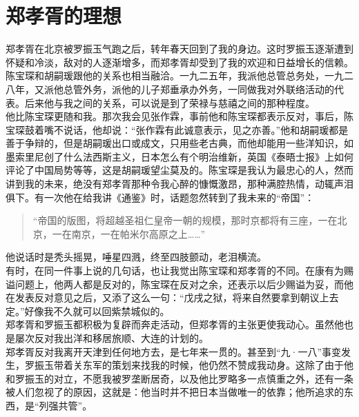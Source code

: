 \fancyhead[RO]{} %
\fancyhead[LE]{} %
\chapter*{郑孝胥的理想}
\thispagestyle{empty}
郑孝胥在北京被罗振玉气跑之后，转年春天回到了我的身边。这时罗振玉逐渐遭到怀疑和冷淡，敌对的人逐渐增多，而郑孝胥却受到了我的欢迎和日益增长的信赖。陈宝琛和胡嗣瑗跟他的关系也相当融洽。一九二五年，我派他总管总务处，一九二八年，又派他总管外务，派他的儿子郑垂承办外务，一同做我对外联络活动的代表。后来他与我之间的关系，可以说是到了荣禄与慈禧之间的那种程度。\\

他比陈宝琛更随和我。那次我会见张作霖，事前他和陈宝琛都表示反对，事后，陈宝琛鼓着嘴不说话，他却说：“张作霖有此诚意表示，见之亦善。”他和胡嗣瑗都是善于争辩的，但是胡嗣瑗出口或成文，只用些老古典，而他却能用一些洋知识，如墨索里尼创了什么法西斯主义，日本怎么有个明治维新，英国《泰晤士报》上如何评论了中国局势等等，这是胡嗣瑗望尘莫及的。陈宝琛是我认为最忠心的人，然而讲到我的未来，绝没有郑孝胥那种令我心醉的慷慨激昂，那种满腔热情，动辄声泪俱下。有一次他在给我讲《通鉴》时，话题忽然转到了我未来的“帝国”：\\

\begin{quote}
	“帝国的版图，将超越圣祖仁皇帝一朝的规模，那时京都将有三座，一在北京，一在南京，一在帕米尔高原之上……”\\
\end{quote}

他说话时是秃头摇晃，唾星四溅，终至四肢颤动，老泪横流。\\

有时，在同一件事上说的几句话，也让我觉出陈宝琛和郑孝胥的不同。在康有为赐谥问题上，他两人都是反对的，陈宝琛在反对之余，还表示以后少赐谥为妥，而他在发表反对意见之后，又添了这么一句：“戊戌之狱，将来自然要拿到朝议上去定。”好像我不久就可以回紫禁城似的。\\

郑孝胥和罗振玉都积极为复辟而奔走活动，但郑孝胥的主张更使我动心。虽然他也是屡次反对我出洋和移居旅顺、大连的计划的。\\

郑孝胥反对我离开天津到任何地方去，是七年来一贯的。甚至到“九·一八”事变发生，罗振玉带着关东军的策划来找我的时候，他仍然不赞成我动身。这除了由于他和罗振玉的对立，不愿我被罗垄断居奇，以及他比罗略多一点慎重之外，还有一条被人们忽视了的原因，这就是：他当时并不把日本当做唯一的依靠；他所追求的东西，是“列强共管”。\\


